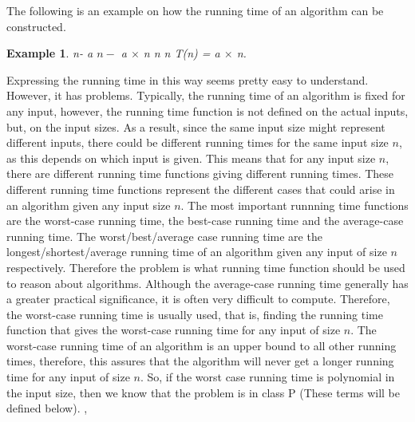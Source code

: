 \documentclass[12pt]{article}
\newtheorem{example}[definition]{Example}
\numberwithin{equation}{subsection}
\numberwithin{table}{subsection}
\begin{document}
The following is an example on how the running time of an algorithm can be constructed.
\begin{example}
\label{example_running}
{} n-{{}} a {} $\mathit{n-}${} a $\times$ n {} n {} n {} T(n) = a $\times$ n. {}
\end{example}
Expressing the running time in this way seems pretty easy to understand. However, it has problems. Typically, the running time of an algorithm is fixed for any input, however, the running time function is not defined on the actual inputs, but, on the input sizes. As a result, since the same input size might represent different inputs, there could be different running times for the same input size $\mathit{n}$, as this depends on which input is given. This means that for any input size $\mathit{n}$, there are different running time functions giving different running times. These different running time functions represent the different cases that could arise in an algorithm given any input size $\mathit{n}$. The most important runnning time functions are the worst-case running time, the best-case running time and the average-case running time. The worst/best/average case running time are the longest/shortest/average running time of an algorithm given any input of size $\mathit{n}$ respectively. Therefore the problem is what running time function should be used to reason about algorithms. Although the average-case running time generally has a greater practical significance, it is often very difficult to compute. Therefore, the worst-case running time is usually used, that is, finding the running time function that gives the worst-case running time for any input of size $\mathit{n}$. The worst-case running time of an algorithm is an upper bound to all other running times, therefore, this assures that the algorithm will never get a longer running time for any input of size $\mathit{n}$. So, if the worst case running time is polynomial in the input size, then we know that the problem is in class P (These terms will be defined below).  \cite{cormen_leiserson_rivest_stein}, \cite{adamchik_2009}\\\\
\end{document}
